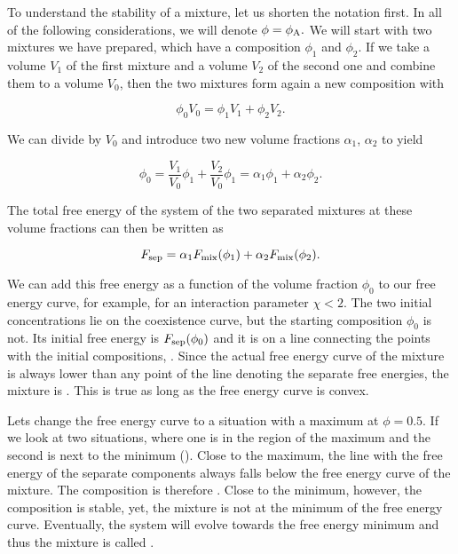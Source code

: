 \documentclass[letterpaper,10pt,english]{sphinxmanual}
\let\sphinxpxdimen\pdfpxdimen\else\newdimen\sphinxpxdimen
\begin{document}
\sphinxAtStartPar
To understand the stability of a mixture, let us shorten the notation first. In all of the following considerations, we will denote \(\phi=\phi_{\rm A}.\) We will start with two mixtures we have prepared, which have a composition \(\phi_1\) and \(\phi_2\). If we take a volume \(V_1\) of the first mixture and a volume \(V_2\) of the second one and combine them to a volume \(V_0\), then the two mixtures form again a new composition with

\sphinxAtStartPar
\begin{equation}
\phi_{0}V_{0}=\phi_{1}V_{1}+\phi_{2}V_{2}.
\end{equation}

\sphinxAtStartPar
We can divide by \(V_0\) and introduce two new volume fractions \(\alpha_1\), \(\alpha_2\) to yield

\sphinxAtStartPar
\begin{equation}
\phi_{0}=\frac{V_{1}}{V_{0}}\phi_{1}+\frac{V_{2}}{V_{0}}\phi_{1}=\alpha_{1}\phi_{1}+\alpha_{2}\phi_{2}.
\end{equation}

\sphinxAtStartPar
The total free energy of the system of the two separated mixtures at these volume fractions can then be written as

\sphinxAtStartPar
\begin{equation}
F_{\rm sep}=\alpha_{1}F_{\rm mix}(\phi_{1})+\alpha_{2}F_{\rm mix}(\phi_{2}).
\end{equation}

\sphinxAtStartPar
We can add this free energy as a function of the volume fraction \(\phi_0\) to our free energy curve, for example, for an interaction parameter \(\chi<2\). The two initial concentrations lie on the coexistence curve, but the starting composition \(\phi_0\) is not. Its initial free energy is \(F_{\rm sep}(\phi_{0})\) and it is on a line connecting the points with the initial compositions, . Since the actual free energy curve of the mixture is always
lower than any point of the line denoting the separate free energies, the mixture is . This is true as long as the free energy curve is convex.

\sphinxAtStartPar
\sphinxincludegraphics[width=400\sphinxpxdimen]{{PhaseTr_2}.png}

\sphinxAtStartPar
Lets change the free energy curve to a situation with a maximum at \(\phi=0.5\). If we look at two situations, where one is in the region of the maximum and the second is next to the minimum (). Close to the maximum, the line with the free energy of the separate components always falls below the free energy curve of the mixture. The composition is therefore . Close to the minimum, however, the composition is stable, yet, the mixture is not at the minimum of the free energy
curve. Eventually, the system will evolve towards the free energy minimum and thus the mixture is called .
\end{document}
